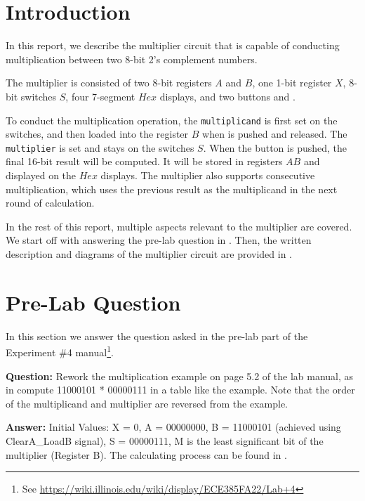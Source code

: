 \documentclass{article}
\begin{document}


\section{Introduction}

In this report, we describe the multiplier circuit that is capable of conducting multiplication between two 8-bit 2's complement numbers. 

The multiplier is consisted of two 8-bit registers $A$ and $B$, one 1-bit register $X$, 8-bit switches $S$, four 7-segment $Hex$ displays, and two buttons  and . 

To conduct the multiplication operation, the \texttt{multiplicand} is first set on the switches, and then loaded into the register $B$ when  is pushed and released. The \texttt{multiplier} is set and stays on the switches $S$. When the  button is pushed, the final 16-bit result will be computed. It will be stored in registers $AB$ and displayed on the $Hex$ displays. The multiplier also supports consecutive multiplication, which uses the previous result as the multiplicand in the next round of calculation.

In the rest of this report, multiple aspects relevant to the multiplier are covered. We start off with answering the pre-lab question in . Then, the written description and diagrams of the multiplier circuit are provided in .


\section{Pre-Lab Question}
\label{sec:pre-lab}
In this section we answer the question asked in the pre-lab part of the Experiment \#4 manual\footnote{See \url{https://wiki.illinois.edu/wiki/display/ECE385FA22/Lab+4}}.

\textbf{Question:} Rework the multiplication example on page 5.2 of the lab manual, as in compute 11000101 * 00000111 in a table like the example. Note that the order of the multiplicand and multiplier are reversed from the example.

\textbf{Answer:} Initial Values: X = 0, A = 00000000, B = 11000101 (achieved using ClearA\_LoadB signal), S = 00000111, M is the least significant bit of the multiplier (Register B). The calculating process can be found in .
\end{document}
